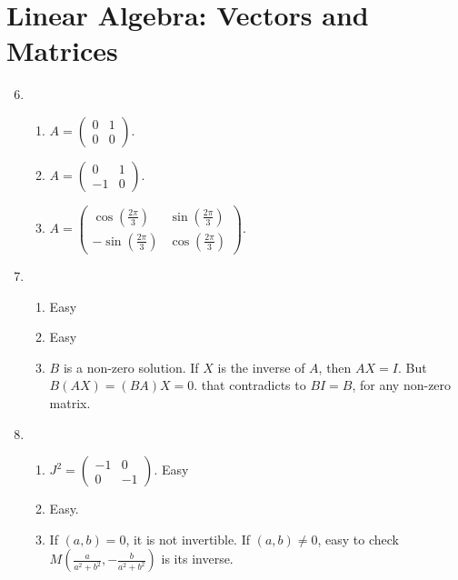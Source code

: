 \documentclass[12pt]{article}
\begin{document}
\section{Linear Algebra: Vectors and Matrices}
\begin{enumerate}
    \setcounter{enumi}{5}
    \item 
        \begin{enumerate}
            \item $A=\begin{pmatrix}
                0&1\\
                0&0
            \end{pmatrix}$.
            \item $A=\begin{pmatrix}
                0&1\\
                -1&0
            \end{pmatrix}$.
            \item $A=
            \begin{pmatrix}
                \cos\left(\frac{2\pi}{3}\right)&\sin\left(\frac{2\pi}{3}\right)\\
                -\sin\left(\frac{2\pi}{3}\right)&\cos\left(\frac{2\pi}{3}\right)
            \end{pmatrix}.$
        \end{enumerate}
    \setcounter{enumi}{7}
    \item \begin{enumerate}
        \item Easy
        \item Easy
        \item $B$ is a non-zero solution. If $X$ is the inverse of $A$, then $AX=I$. But $B(AX)=(BA)X=0$. that contradicts to $BI=B$, for any non-zero matrix.
    \end{enumerate}
    \item \begin{enumerate}
        \item $J^2=\begin{pmatrix}
            -1&0\\
            0&-1
        \end{pmatrix}$. Easy
        \item Easy.
        \item If $(a,b)=0$, it is not invertible. If $(a,b)\not=0$, easy to check $M\left(\frac{a}{a^2+b^2},-\frac{b}{a^2+b^2}\right)$ is its inverse.
    \end{enumerate}
    \setcounter{enumi}{10}

\end{enumerate}
\end{document}
